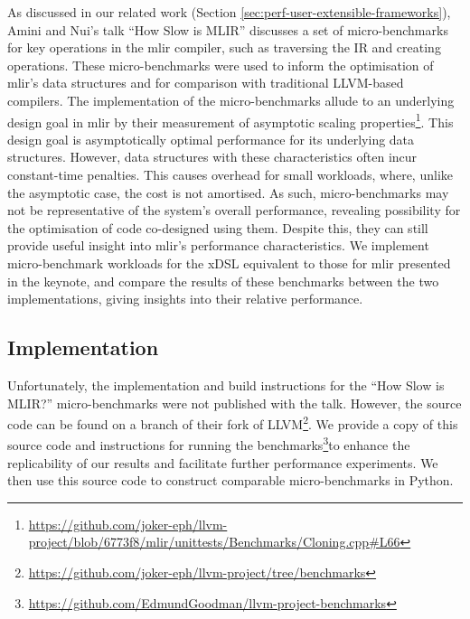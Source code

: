 As discussed in our related work (Section \ref{sec:perf-user-extensible-frameworks}), Amini and Nui's talk ``How Slow is MLIR'' \cite{aminiHowSlowMLIR2024} discusses a set of micro-benchmarks for key operations in the \ac{mlir} compiler, such as traversing the IR and creating operations.
These micro-benchmarks were used to inform the optimisation of \ac{mlir}'s data structures and for comparison with traditional LLVM-based compilers. The implementation of the micro-benchmarks allude to an underlying design goal in \ac{mlir} by their measurement of asymptotic scaling properties\footnote{\scriptsize{\url{https://github.com/joker-eph/llvm-project/blob/6773f8/mlir/unittests/Benchmarks/Cloning.cpp\#L66}}}. This design goal is asymptotically optimal performance for its underlying data structures. However, data structures with these characteristics often incur constant-time penalties.
This causes overhead for small workloads, where, unlike the asymptotic case, the cost is not amortised. As such, micro-benchmarks may not be representative of the system's overall performance, revealing possibility for the optimisation of code co-designed using them.
Despite this, they can still provide useful insight into \ac{mlir}'s performance characteristics.
We implement micro-benchmark workloads for the xDSL equivalent to those for \ac{mlir} presented in the keynote, and compare the results of these benchmarks between the two implementations, giving insights into their relative performance.

\subsection{Implementation}
\label{ssec:ubenchmark-implementation}

Unfortunately, the implementation and build instructions for the ``How Slow is MLIR?'' micro-benchmarks were not published with the talk.
However, the source code can be found on a branch of their fork of LLVM\footnote{\scriptsize{\url{https://github.com/joker-eph/llvm-project/tree/benchmarks}}}. We provide a copy of this source code and instructions for running the benchmarks\ifsubmission\else\footnote{\scriptsize{\url{https://github.com/EdmundGoodman/llvm-project-benchmarks}}}\fi to enhance the replicability of our results and facilitate further performance experiments.
We then use this source code to construct comparable micro-benchmarks in Python.

